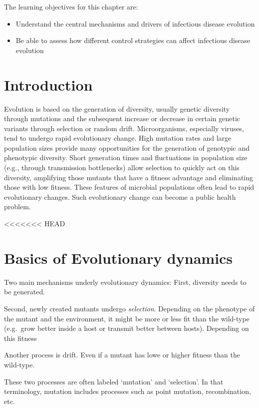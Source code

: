 \documentclass[]{book}
\providecommand{\tightlist}{%
  \setlength{\itemsep}{0pt}\setlength{\parskip}{0pt}}
\theoremstyle{definition}
\theoremstyle{definition}
\theoremstyle{definition}
\theoremstyle{remark}
\begin{document}
The learning objectives for this chapter are:

\begin{itemize}
\tightlist
\item
  Understand the central mechanisms and drivers of infectious disease
  evolution
\item
  Be able to assess how different control strategies can affect
  infectious disease evolution
\end{itemize}

\hypertarget{introduction-8}{%
\section{Introduction}\label{introduction-8}}

Evolution is based on the generation of diversity, usually genetic
diversity through mutations and the subsequent increase or decrease in
certain genetic variants through selection or random drift.
Microorganisms, especially viruses, tend to undergo rapid evolutionary
change. High mutation rates and large population sizes provide many
opportunities for the generation of genotypic and phenotypic diversity.
Short generation times and fluctuations in population size (e.g.,
through transmission bottlenecks) allow selection to quickly act on this
diversity, amplifying those mutants that have a fitness advantage and
eliminating those with low fitness. These features of microbial
populations often lead to rapid evolutionary changes. Such evolutionary
change can become a public health problem.

<<<<<<< HEAD
\hypertarget{basics-of-evolutionary-dynamics}{%
\section{Basics of Evolutionary
dynamics}\label{basics-of-evolutionary-dynamics}}

Two main mechanisms underly evolutionary dynamics: First, diversity
needs to be generated.

Second, newly created mutants undergo \emph{selection}. Depending on the
phenotype of the mutant and the environment, it might be more or less
fit than the wild-type (e.g.~grow better inside a host or transmit
better between hosts). Depending on this fitness

Another process is drift. Even if a mutant has lowe or higher fitness
than the wild-type.

These two processes are often labeled `mutation' and `selection'. In
that terminology, mutation includes processes such as point mutation,
recombination, etc.
\end{document}
